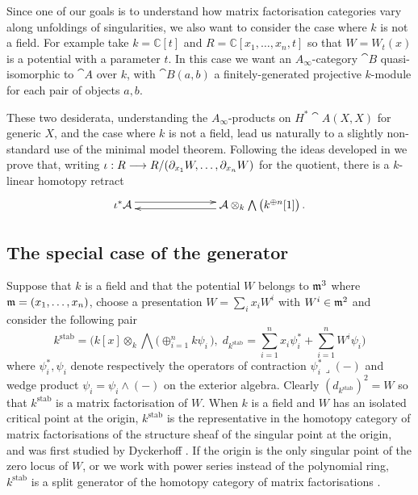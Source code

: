\documentclass[english,letter paper,12pt,leqno]{article}
\theoremstyle{example}
\numberwithin{equation}{section}
\def\stab{\operatorname{stab}}
\def\be{\begin{equation}}
\def\ee{\end{equation}}
\begin{document}
Since one of our goals is to understand how matrix factorisation categories vary along unfoldings of singularities, we also want to consider the case where $k$ is not a field. For example take $k = \mathbb{C}[t]$ and $R = \mathbb{C}[x_1,\ldots,x_n, t]$ so that $W = W_t(x)$ is a potential with a parameter $t$. In this case we want an $A_\infty$-category $\cat{B}$ quasi-isomorphic to $\cat{A}$ over $k$, with $\cat{B}(a,b)$ a finitely-generated projective $k$-module for each pair of objects $a,b$. 
\vspace{0.2cm}

These two desiderata, understanding the $A_\infty$-products on $H^*\cat{A}(X,X)$ for generic $X$, and the case where $k$ is not a field, lead us naturally to a slightly non-standard use of the minimal model theorem. Following the ideas developed in \cite{??,??,??} we prove that, writing $\iota: R \longrightarrow R/(\partial_{x_1} W, \ldots, \partial_{x_n} W)$ for the quotient, there is a $k$-linear homotopy retract
\be\label{eq:intro_he}
\xymatrix@C+4pc{
\iota^* \cat{A} \ar@<0.7ex>[r] & \cat{A} \otimes_k \bigwedge\big( k^{\oplus n}[1] \big) \ar@<0.7ex>[l]\,.
}
\ee

\subsection{The special case of the generator}

Suppose that $k$ is a field and that the potential $W$ belongs to $\mathfrak{m}^3$ where $\mathfrak{m} = (x_1,\ldots,x_n)$, choose a presentation $W = \sum_i x_i W^i$ with $W^i \in \mathfrak{m}^2$ and consider the following pair
\begin{equation}\label{eq:kstab}
k^{\operatorname{stab}} = \Big( k[x] \otimes_k \bigwedge\big( \oplus_{i=1}^n k\psi_i \,\big), \;d_{k^{\stab}} = \sum_{i=1}^n x_i \psi_i^* + \sum_{i=1}^n W^i \psi_i \Big)
\end{equation}
where $\psi_i^*, \psi_i$ denote respectively the operators of contraction $\psi_i^* \lrcorner (-)$ and wedge product $\psi_i = \psi_i \wedge (-)$ on the exterior algebra. Clearly $(d_{k^{\stab}})^2 = W$ so that $k^{\stab}$ is a matrix factorisation of $W$. When $k$ is a field and $W$ has an isolated critical point at the origin, $k^{\stab}$ is the representative in the homotopy category of matrix factorisations of the structure sheaf of the singular point at the origin, and was first studied by Dyckerhoff \cite{d0904.4713}. If the origin is the only singular point of the zero locus of $W$, or we work with power series instead of the polynomial ring, $k^{\stab}$ is a split generator of the homotopy category of matrix factorisations \cite[Theorem ?]{?}.
\end{document}
